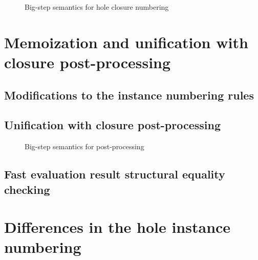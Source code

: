 \begin{figure}
  \centering
  \begin{mdframed}
    \begin{singlespace}
      
    \end{singlespace}
  \end{mdframed}
  \caption{Big-step semantics for hole closure numbering}
  \label{fig:big-step-renumber-new-rules}
\end{figure}


\section{Memoization and unification with closure post-processing}
\label{sec:renumbering_memoization}

\subsection{Modifications to the instance numbering rules}
\label{sec:memoization-instance-numbering}

\subsection{Unification with closure post-processing}
\label{sec:unification-postprocessing}

\begin{figure}
  \centering
  \begin{mdframed}
    \begin{singlespace}
      
    \end{singlespace}
  \end{mdframed}
  \caption{Big-step semantics for post-processing}
  \label{fig:big-step-postprocessing-rules}
\end{figure}

\subsection{Fast evaluation result structural equality checking}
\label{sec:fast-equals}

\section{Differences in the hole instance numbering}
\label{sec:differences_numbering}


